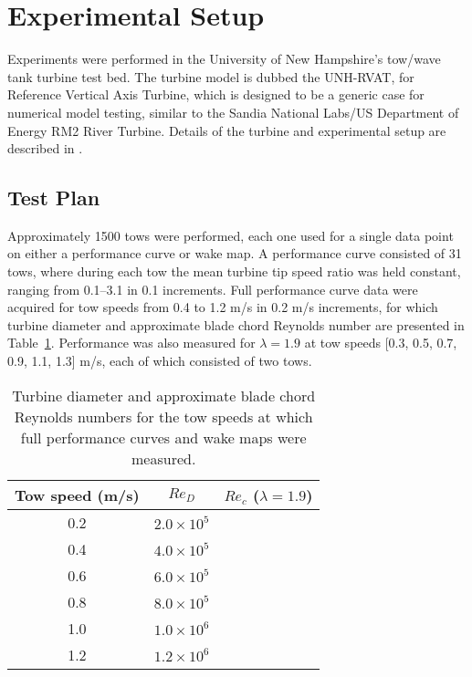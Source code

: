 \documentclass[energies,article,accept,moreauthors,pdftex,12pt,a4paper]{mdpi}
\begin{document}
\section{Experimental Setup}

Experiments were performed in the University of New Hampshire's tow/wave tank
turbine test bed. The turbine model is dubbed the UNH-RVAT, for Reference
Vertical Axis Turbine, which is designed to be a generic case for numerical
model testing, similar to the Sandia National Labs/US Department of Energy RM2
River Turbine. Details of the turbine and experimental setup are described in
\cite{Bachant2014_JOT}.



\subsection{Test Plan} 

Approximately 1500 tows were performed, each one used for a single data point on
either a performance curve or wake map. A performance curve consisted of 31
tows, where during each tow the mean turbine tip speed ratio was held constant,
ranging from 0.1--3.1 in 0.1 increments. Full performance curve data were
acquired for tow speeds from 0.4 to 1.2 m/s in 0.2 m/s increments, for which
turbine diameter and approximate blade chord Reynolds number are presented in
Table~\ref{tab:Re}. Performance was also measured for $\lambda=1.9$ at tow
speeds [0.3, 0.5, 0.7, 0.9, 1.1, 1.3] m/s, each of which consisted of two tows.

\begin{table}
\centering
\begin{tabular}{ccc}
Tow speed (m/s) & $Re_D$ & $Re_c$ ($\lambda = 1.9$) \\ 
\hline
0.2 & $2.0 \times 10^5$ &  \\ 
0.4 & $4.0 \times 10^5$ &  \\ 
0.6 & $6.0 \times 10^5$ &  \\ 
0.8 & $8.0 \times 10^5$ &  \\ 
1.0 & $1.0 \times 10^6$ &  \\ 
1.2 & $1.2 \times 10^6$ &  \\ 
\end{tabular} 
\caption{Turbine diameter and approximate blade chord Reynolds numbers for the
tow speeds at which full performance curves and wake maps were measured.}
\label{tab:Re}
\end{table}
\end{document}

